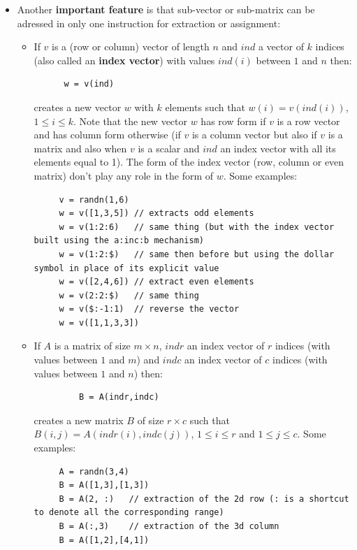 \begin{itemize}
\item Another {\bf important feature} is that sub-vector or sub-matrix
      can be adressed in only one instruction for extraction or assignment:
      \begin{itemize}
      \item If $v$ is a (row or column) vector of length $n$ and  $ind$ a vector 
      of $k$ indices (also called an {\bf index vector}) 
      with values $ind(i)$ between $1$ and $n$ then:
      \begin{Verbatim}
      w = v(ind)
      \end{Verbatim}
      creates a new vector $w$ with $k$ elements such that $w(i) = v(ind(i))$, $1 \le i \le k$.
     Note that the new vector $w$ has row form if $v$ is a row vector
     and has column form otherwise (if $v$ is a column vector but also 
     if $v$ is a matrix and also when $v$ is a scalar and $ind$ an index 
     vector with all its elements equal to 1). The form of the index vector
     (row, column or even matrix) don't play any role in the form
     of $w$. Some examples:
     \begin{Verbatim}
     v = randn(1,6)
     w = v([1,3,5]) // extracts odd elements
     w = v(1:2:6)   // same thing (but with the index vector built using the a:inc:b mechanism)
     w = v(1:2:$)   // same then before but using the dollar symbol in place of its explicit value
     w = v([2,4,6]) // extract even elements
     w = v(2:2:$)   // same thing
     w = v($:-1:1)  // reverse the vector
     w = v([1,1,3,3])
     \end{Verbatim}
 
     \item If $A$ is a matrix of size $m \times n$, $indr$ an index vector of $r$ indices (with values
     between $1$ and $m$) and $indc$ an index vector of $c$ indices (with values between $1$ and $n$)
          then:
     \begin{Verbatim}
         B = A(indr,indc)
     \end{Verbatim}
     creates a new matrix $B$ of size $r \times c$ such that $B(i,j) = A(indr(i),indc(j))$, $1 \le i \le r$
     and $1 \le j \le c$. Some examples:
     \begin{Verbatim}
     A = randn(3,4)
     B = A([1,3],[1,3])
     B = A(2, :)   // extraction of the 2d row (: is a shortcut to denote all the corresponding range)
     B = A(:,3)    // extraction of the 3d column
     B = A([1,2],[4,1])
     \end{Verbatim}
 

\end{itemize}
\end{itemize}
